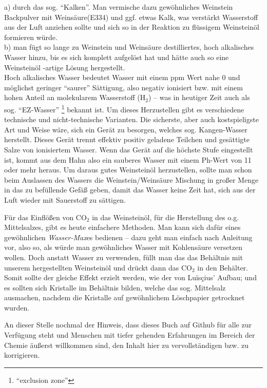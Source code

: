 \documentclass[a5paper,fontsize=10pt]{memoir}
\begin{document}
a) durch das sog. ``Kalken''.
Man vermische dazu gewöhnliches Weinstein Backpulver
mit Weinsäure(E334) und ggf. etwas Kalk,
was verstärkt Wasserstoff aus der Luft anziehen sollte
und sich so in der Reaktion
zu flüssigem Weinsteinöl formieren würde.\\

b) man fügt so lange zu Weinstein und Weinsäure
destilliertes, hoch alkalisches Wasser hinzu,
bis es sich komplett aufgelöst hat
und hätte auch so eine Weinsteinöl%
\hyp{}artige Lösung hergestellt.\\

Hoch alkalisches Wasser bedeutet Wasser mit einem ppm Wert nahe 0 und möglichst geringer ``saurer'' Sättigung, also negativ ionisiert bzw. mit einem hohen Anteil an molekularem Wasserstoff (H$_2$) -- was in heutiger Zeit auch als sog. ``EZ-Wasser''%
\footnote{``exclusion zone''}
bekannt ist. Um dieses Herzustellen gibt es verschiedene technische und nicht-technische Varianten. Die sicherste, aber auch kostspieligste Art und Weise wäre, sich ein Gerät zu besorgen, welches sog. Kangen-Wasser herstellt. Dieses Gerät trennt effektiv positiv geladene Teilchen und gesättigte Salze von ionisiertem Wasser. Wenn das Gerät auf die höchste Stufe eingestellt ist, kommt aus dem Hahn also ein sauberes Wasser mit einem Ph-Wert von 11 oder mehr heraus. Um daraus gutes Weinsteinöl herzustellen, sollte man schon beim Auslassen des Wassers die Weinstein/Weinsäure Mischung in großer Menge in das zu befüllende Gefäß geben, damit das Wasser keine Zeit hat, sich aus der Luft wieder mit Sauerstoff zu sättigen.

Für das Einflößen von CO$_2$ in das Weinsteinöl, für die Herstellung des o.g. Mittelsalzes, gibt es heute einfachere Methoden. Man kann sich dafür eines gewöhnlichen \emph{Wasser-Max}es bedienen -- dazu geht man einfach nach Anleitung vor, also so, als würde man gewöhnliches Wasser mit Kohlensäure versetzen wollen. Doch anstatt Wasser zu verwenden, füllt man das das Behältnis mit unserem hergestellten Weinsteinöl und drückt dann das CO$_2$ in den Behälter. Somit sollte der gleiche Effekt erzielt werden, wie der von Luïsçius' Aufbau; und es sollten sich Kristalle im Behältnis bilden, welche das sog. Mittelsalz ausmachen, nachdem die Kristalle auf gewöhnlichem Löschpapier getrocknet wurden.

An dieser Stelle nochmal der Hinweis, dass dieses
Buch auf Github für alle zur Verfügung steht und
Menschen mit tiefer gehenden Erfahrungen
im Bereich der Chemie äußerst willkommen sind,
den Inhalt hier zu vervollständigen bzw. zu korrigieren.
\end{document}
